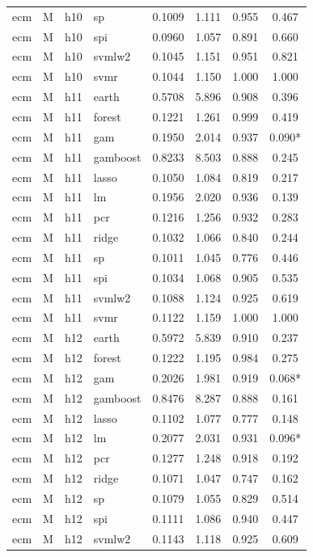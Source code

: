 \begin{ThreePartTable}
\begin{longtable}[t]{llclcccc}
ecm & M & h10 & sp & 0.1009 & 1.111 & 0.955 & 0.467\\
ecm & M & h10 & spi & 0.0960 & 1.057 & 0.891 & 0.660\\
ecm & M & h10 & svmlw2 & 0.1045 & 1.151 & 0.951 & 0.821\\
ecm & M & h10 & svmr & 0.1044 & 1.150 & 1.000 & 1.000\\
\addlinespace
ecm & M & h11 & earth & 0.5708 & 5.896 & 0.908 & 0.396\\
ecm & M & h11 & forest & 0.1221 & 1.261 & 0.999 & 0.419\\
ecm & M & h11 & gam & 0.1950 & 2.014 & 0.937 & 0.090*\\
ecm & M & h11 & gamboost & 0.8233 & 8.503 & 0.888 & 0.245\\
ecm & M & h11 & lasso & 0.1050 & 1.084 & 0.819 & 0.217\\
ecm & M & h11 & lm & 0.1956 & 2.020 & 0.936 & 0.139\\
ecm & M & h11 & pcr & 0.1216 & 1.256 & 0.932 & 0.283\\
ecm & M & h11 & ridge & 0.1032 & 1.066 & 0.840 & 0.244\\
ecm & M & h11 & sp & 0.1011 & 1.045 & 0.776 & 0.446\\
ecm & M & h11 & spi & 0.1034 & 1.068 & 0.905 & 0.535\\
ecm & M & h11 & svmlw2 & 0.1088 & 1.124 & 0.925 & 0.619\\
ecm & M & h11 & svmr & 0.1122 & 1.159 & 1.000 & 1.000\\
\addlinespace
ecm & M & h12 & earth & 0.5972 & 5.839 & 0.910 & 0.237\\
ecm & M & h12 & forest & 0.1222 & 1.195 & 0.984 & 0.275\\
ecm & M & h12 & gam & 0.2026 & 1.981 & 0.919 & 0.068*\\
ecm & M & h12 & gamboost & 0.8476 & 8.287 & 0.888 & 0.161\\
ecm & M & h12 & lasso & 0.1102 & 1.077 & 0.777 & 0.148\\
ecm & M & h12 & lm & 0.2077 & 2.031 & 0.931 & 0.096*\\
ecm & M & h12 & pcr & 0.1277 & 1.248 & 0.918 & 0.192\\
ecm & M & h12 & ridge & 0.1071 & 1.047 & 0.747 & 0.162\\
ecm & M & h12 & sp & 0.1079 & 1.055 & 0.829 & 0.514\\
ecm & M & h12 & spi & 0.1111 & 1.086 & 0.940 & 0.447\\
ecm & M & h12 & svmlw2 & 0.1143 & 1.118 & 0.925 & 0.609\\

\end{longtable}
\end{ThreePartTable}
